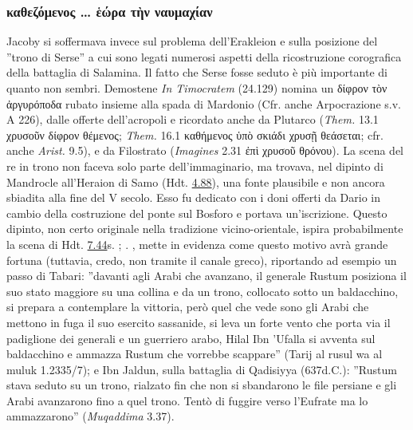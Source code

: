 {\subsubsection{\textgreek{καθεζόμενος … ἑώρα τὴν ναυμαχίαν}}\label{tronoserse}
Jacoby si soffermava invece sul problema dell'Erakleion e sulla posizione del ''trono di Serse'' a cui sono legati numerosi aspetti della ricostruzione corografica della battaglia di Salamina. 
Il fatto che Serse fosse seduto è più importante di quanto non sembri. Demostene \emph{In Timocratem} (24.129) nomina un \textgreek{δίφρον τὸν ἀργυρόποδα} rubato insieme alla spada di Mardonio (Cfr. anche Arpocrazione s.v. A 226), dalle offerte dell'acropoli e ricordato anche da Plutarco (\emph{Them.}   13.1 \textgreek{χρυσοῦν δίφρον θέμενος}; \emph{Them.}   16.1 \textgreek{καθήμενος ὑπὸ σκιάδι χρυσῇ θεάσεται}; cfr. anche \emph{Arist. }9.5), e da Filostrato (\emph{Imagines} 2.31 \textgreek{ἐπὶ χρυσοῦ θρόνου}). La scena del re in trono non faceva solo parte dell'immaginario, ma trovava, nel dipinto di Mandrocle all'Heraion di Samo (Hdt. \href{http://data.perseus.org/citations/urn:cts:greekLit:tlg0016.tlg001.perseus-grc1:4.88}{4.88}), una fonte plausibile e non ancora sbiadita alla fine del V secolo. Esso fu dedicato con i doni offerti da Dario in cambio della costruzione del ponte sul Bosforo e portava un'iscrizione. Questo dipinto, non certo originale nella tradizione vicino-orientale, ispira probabilmente la scena di Hdt. \href{http://data.perseus.org/citations/urn:cts:greekLit:tlg0016.tlg001.perseus-grc1:7.44}{7.44}s. \cite[267]{Asheri2003}; \cite[234 e 939-940]{Briant1996}. \cite[50-51]{Taboada1999}, mette in evidenza come questo motivo avrà grande fortuna (tuttavia, credo, non tramite il canale greco), riportando ad esempio un passo di Tabari: ''davanti agli Arabi che avanzano, il generale Rustum posiziona il suo stato maggiore su una collina e da un trono, collocato sotto un baldacchino, si prepara a contemplare la vittoria, però quel che vede sono gli Arabi che mettono in fuga il suo esercito sassanide, si leva un forte vento che porta via il padiglione dei generali e un guerriero arabo, Hilal Ibn 'Ufalla si avventa sul baldacchino e ammazza Rustum che vorrebbe scappare'' (Tarij al rusul wa al muluk 1.2335/7); e  Ibn Jaldun, sulla battaglia di Qadisiyya (637d.C.): ''Rustum stava seduto su un trono, rialzato fin che non si sbandarono le file persiane e gli Arabi avanzarono fino a quel trono. Tentò di fuggire verso l'Eufrate ma lo ammazzarono'' (\emph{Muqaddima} 3.37). 
}
